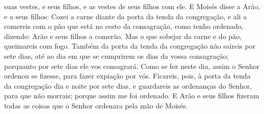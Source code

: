 suas vestes, e seus filhos, e as vestes de seus filhos com ele.
E Moisés disse a Arão, e a seus filhos: Cozei a carne diante
da porta da tenda da congregação, e ali a comereis com o pão que
está no cesto da consagração, como tenho ordenado, dizendo: Arão e
seus filhos a comerão. Mas o que sobejar da carne e do pão,
queimareis com fogo. Também da porta da tenda da congregação
não saireis por sete dias, até ao dia em que se cumprirem os dias da
vossa consagração; porquanto por sete dias ele vos consagrará.
Como se fez neste dia, assim o Senhor ordenou se fizesse,
para fazer expiação por vós. Ficareis, pois, à porta da tenda
da congregação dia e noite por sete dias, e guardareis as ordenanças
do Senhor, para que não morrais; porque assim me foi ordenado.
E Arão e seus filhos fizeram todas as coisas que o Senhor
ordenara pela mão de Moisés.

\medskip

